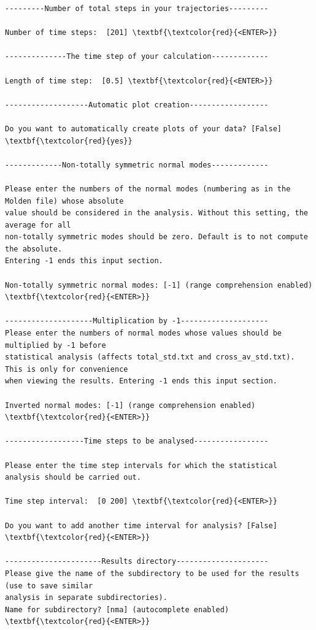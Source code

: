 \documentclass[a4paper,11pt,DIV=15,openany]{scrbook}
\begin{document}
\begin{oframed}
\begin{Verbatim}[commandchars=\\\{\}]
---------Number of total steps in your trajectories---------

Number of time steps:  [201] \textbf{\textcolor{red}{<ENTER>}}

--------------The time step of your calculation-------------

Length of time step:  [0.5] \textbf{\textcolor{red}{<ENTER>}}

-------------------Automatic plot creation------------------

Do you want to automatically create plots of your data? [False] \textbf{\textcolor{red}{yes}}

-------------Non-totally symmetric normal modes-------------

Please enter the numbers of the normal modes (numbering as in the Molden file) whose absolute 
value should be considered in the analysis. Without this setting, the average for all 
non-totally symmetric modes should be zero. Default is to not compute the absolute. 
Entering -1 ends this input section.

Non-totally symmetric normal modes: [-1] (range comprehension enabled) \textbf{\textcolor{red}{<ENTER>}}

--------------------Multiplication by -1--------------------
Please enter the numbers of normal modes whose values should be multiplied by -1 before 
statistical analysis (affects total_std.txt and cross_av_std.txt). This is only for convenience
when viewing the results. Entering -1 ends this input section.

Inverted normal modes: [-1] (range comprehension enabled) \textbf{\textcolor{red}{<ENTER>}}

------------------Time steps to be analysed-----------------

Please enter the time step intervals for which the statistical analysis should be carried out. 

Time step interval:  [0 200] \textbf{\textcolor{red}{<ENTER>}}

Do you want to add another time interval for analysis? [False] \textbf{\textcolor{red}{<ENTER>}}

----------------------Results directory---------------------
Please give the name of the subdirectory to be used for the results (use to save similar 
analysis in separate subdirectories).
Name for subdirectory? [nma] (autocomplete enabled) \textbf{\textcolor{red}{<ENTER>}}


\end{Verbatim}
\end{oframed}
\end{document}
